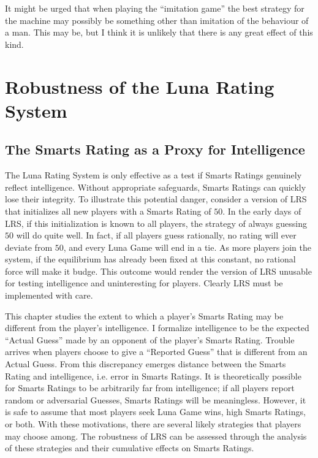 \begin{savequote}[75mm]
It might be urged that when playing the ``imitation game'' the best strategy for the machine may possibly be something other than imitation of the behaviour of a man. This may be, but I think it is unlikely that there is any great effect of this kind.
\end{savequote}

\chapter{Robustness of the Luna Rating System}

\section{The Smarts Rating as a Proxy for Intelligence}

The Luna Rating System is only effective as a test if Smarts Ratings genuinely reflect intelligence. Without appropriate safeguards, Smarts Ratings can quickly lose their integrity. To illustrate this potential danger, consider a version of LRS that initializes all new players with a Smarts Rating of $50$. In the early days of LRS, if this initialization is known to all players, the strategy of always guessing $50$ will do quite well. In fact, if all players guess rationally, no rating will ever deviate from $50$, and every Luna Game will end in a tie. As more players join the system, if the equilibrium has already been fixed at this constant, no rational force will make it budge. This outcome would render the version of LRS unusable for testing intelligence and uninteresting for players. Clearly LRS must be implemented with care.

This chapter studies the extent to which a player's Smarts Rating may be different from the player's intelligence. I formalize intelligence to be the expected ``Actual Guess'' made by an opponent of the player's Smarts Rating. Trouble arrives when players choose to give a ``Reported Guess'' that is different from an Actual Guess. From this discrepancy emerges distance between the Smarts Rating and intelligence, i.e. error in Smarts Ratings. It is theoretically possible for Smarts Ratings to be arbitrarily far from intelligence; if all players report random or adversarial Guesses, Smarts Ratings will be meaningless. However, it is safe to assume that most players seek Luna Game wins, high Smarts Ratings, or both. With these motivations, there are several likely strategies that players may choose among. The robustness of LRS can be assessed through the analysis of these strategies and their cumulative effects on Smarts Ratings.

